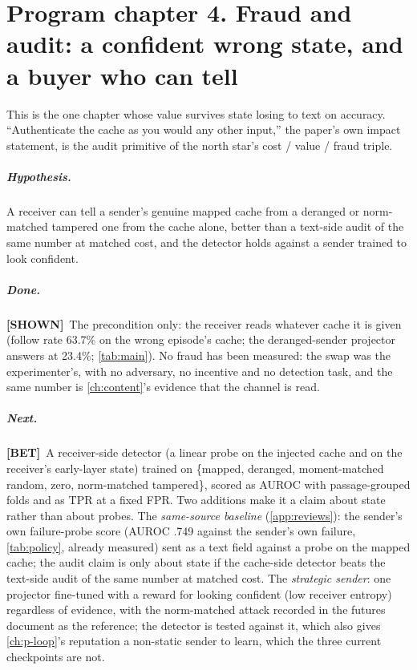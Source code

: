 \documentclass[11pt,a4paper]{report}
\newcommand{\SHOWN}{\textcolor{shownc}{\textbf{\scriptsize[SHOWN]}}}
\newcommand{\BET}{\textcolor{betc}{\textbf{\scriptsize[BET]}}}
\newcommand{\mbet}{\marginnote{\BET}}
\begin{document}
\chapter{Program chapter 4. Fraud and audit: a confident wrong state, and a buyer who can tell}
\label{ch:p-fraud}

This is the one chapter whose value survives state losing to text on accuracy. ``Authenticate the cache as you would any other input,'' the paper's own impact statement, is the audit primitive of the north star's cost / value / fraud triple.

\paragraph{Hypothesis.} \mbet A receiver can tell a sender's genuine mapped cache from a deranged or norm-matched tampered one from the cache alone, better than a text-side audit of the same number at matched cost, and the detector holds against a sender trained to look confident.

\paragraph{Done.} \SHOWN\ The precondition only: the receiver reads whatever cache it is given (follow rate 63.7\% on the wrong episode's cache; the deranged-sender projector answers at 23.4\%; \cref{tab:main}). No fraud has been measured: the swap was the experimenter's, with no adversary, no incentive and no detection task, and the same number is \cref{ch:content}'s evidence that the channel is read.

\paragraph{Next.} \BET\ A receiver-side detector (a linear probe on the injected cache and on the receiver's early-layer state) trained on \{mapped, deranged, moment-matched random, zero, norm-matched tampered\}, scored as AUROC with passage-grouped folds and as TPR at a fixed FPR. Two additions make it a claim about state rather than about probes. The \emph{same-source baseline} (\cref{app:reviews}): the sender's own failure-probe score (AUROC .749 against the sender's own failure, \cref{tab:policy}, already measured) sent as a text field against a probe on the mapped cache; the audit claim is only about state if the cache-side detector beats the text-side audit of the same number at matched cost. The \emph{strategic sender}: one projector fine-tuned with a reward for looking confident (low receiver entropy) regardless of evidence, with the norm-matched attack recorded in the futures document as the reference; the detector is tested against it, which also gives \cref{ch:p-loop}'s reputation a non-static sender to learn, which the three current checkpoints are not.
\end{document}
